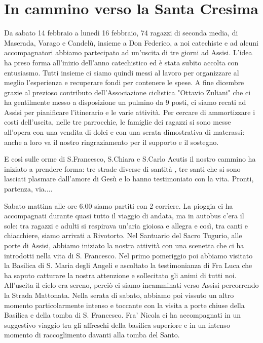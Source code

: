 \section{In cammino verso la Santa Cresima}

Da sabato 14 febbraio a lunedì 16 febbraio, 74 ragazzi di seconda media, di Maserada, Varago e Candelù, insieme  a Don Federico, a noi catechiste  e ad alcuni accompagnatori abbiamo partecipato ad un'uscita di tre giorni ad Assisi.  L'idea ha preso forma all'inizio dell'anno catechistico ed è stata subito accolta con entusiasmo. Tutti insieme  ci siamo quindi  messi al lavoro per organizzare al meglio l'esperienza e recuperare fondi per contenere le spese. A fine dicembre grazie al prezioso contributo dell'Associazione ciclistica "Ottavio Zuliani" che ci ha gentilmente messo a disposizione un pulmino da 9 posti, ci siamo recati ad Assisi per pianificare  l'itinerario e le varie attività. Per cercare di ammortizzare i costi dell'uscita, nelle tre parrocchie, le famiglie dei ragazzi  si sono messe all'opera con una vendita di dolci e con una serata dimostrativa di materassi: anche a loro va il nostro ringraziamento per il supporto e il sostegno.

E così sulle orme di S.Francesco, S.Chiara e S.Carlo Acutis  il nostro cammino ha iniziato a prendere forma: tre strade diverse di santità , tre santi che si sono lasciati plasmare dall'amore di Gesù e lo hanno testimoniato con la  vita.  
Pronti, partenza, via....

Sabato mattina alle ore 6.00 siamo partiti con 2 corriere. La pioggia ci ha accompagnati durante quasi tutto il viaggio di andata, ma in autobus c'era il sole: tra ragazzi e adulti si respirava un'aria gioiosa e allegra e così,  tra canti e chiacchiere, siamo arrivati a Rivotorto. Nel Santuario del Sacro Tugurio, alle porte di Assisi, abbiamo iniziato la nostra attività  con una scenetta che ci ha introdotti nella vita di S. Francesco. Nel primo pomeriggio poi abbiamo visitato la Basilica di S. Maria degli Angeli e ascoltato la testimonianza di  Fra Luca che ha saputo catturare la nostra attenzione e sollecitato gli animi di tutti noi. All'uscita il cielo era sereno, perciò ci siamo incamminati verso Assisi percorrendo la Strada Mattonata. Nella serata di sabato, abbiamo poi vissuto un altro momento particolarmente intenso e toccante con la  visita a porte chiuse della Basilica e della tomba di S. Francesco. Fra' Nicola ci ha accompagnati in un suggestivo viaggio tra gli affreschi della basilica superiore e in un intenso momento di raccoglimento davanti  alla tomba del Santo.

